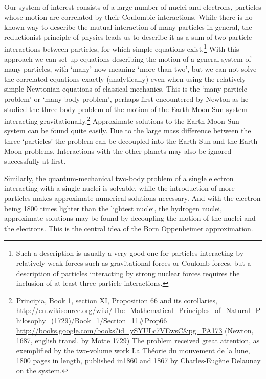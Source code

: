 \documentclass[11pt,bibliography=totoc,index=totoc]{scrbook}   %
\begin{document}
Our system of interest consists of a large number of nuclei and electrons, particles whose motion are correlated by their Coulombic interactions. 
While there is no known way to describe the mutual interaction of many particles in general, the reductionist principle of physics leads us to describe it as a sum of two-particle interactions between particles, for which simple equations exist.\footnote{
Such a description is usually a very good one for particles interacting by relatively weak forces such as gravitational forces or Coulomb forces, but a description of particles interacting by strong nuclear forces requires the inclusion of at least three-particle interactions.}
With this approach we can set up equations describing the motion of a general system of many particles, with `many' now meaning `more than two', but we can not solve the correlated equations exactly (analytically) even when using the relatively simple Newtonian equations of classical mechanics. 
This is the `many-particle problem' or `many-body problem', perhaps first encountered by Newton as he studied the three-body problem of the motion of the Earth-Moon-Sun system interacting gravitationally.\footnote{Principia, Book 1, section XI, Proposition 66 and its corollaries,
\url{http://en.wikisource.org/wiki/The_Mathematical_Principles_of_Natural_Philosophy_(1729)/Book_1/Section_11\#Prop66}
\url{http://books.google.com/books?id=ySYULc7VEwsC&pg=PA173}
(Newton, 1687, english transl. by Motte 1729) 
The problem received great attention, as exemplified by the two-volume work La Théorie du mouvement de la lune, 1800 pages in length, published in1860 and 1867 by Charles-Eugène Delaunay on the system.}
Approximate solutions to the Earth-Moon-Sun system can be found quite easily. 
Due to the large mass difference between the three `particles' the problem can be decoupled into the Earth-Sun and the Earth-Moon problems.
Interactions with the other planets may also be ignored successfully at first.

Similarly, the quantum-mechanical two-body problem of a single electron interacting with a single nuclei is solvable, while the introduction of more particles makes approximate numerical solutions necessary. 
And with the electron being 1800 times lighter than the lightest nuclei, the hydrogen nuclei, approximate solutions may be found by decoupling the motion of the nuclei and the electrons. 
This is the central idea of the Born Oppenheimer approximation\cite{BO:1927}.
\end{document}
